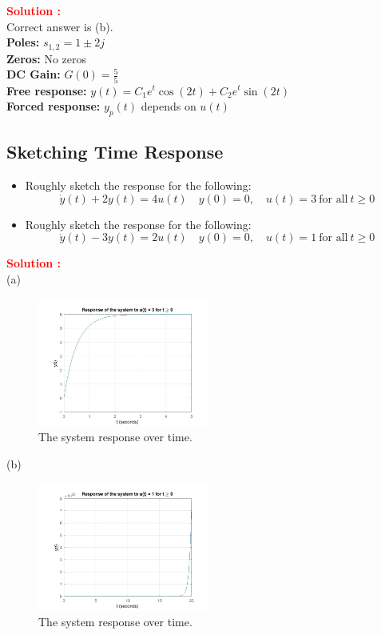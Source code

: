 \documentclass[12pt]{article}
\begin{document}
\textbf{\textcolor{red}{Solution :}} \\
Correct answer is (b).\\
\textbf{Poles:} \(s_{1,2} = 1 \pm 2j\) \\
\textbf{Zeros:} No zeros \\
\textbf{DC Gain:} \(G(0) = \frac{5}{5}\) \\
\textbf{Free response:} \(y(t) = C_1 e^{t} \cos(2t) + C_2 e^{t} \sin(2t)\) \\
\textbf{Forced response:} \(y_p(t)\) depends on \(u(t)\) \\
\clearpage

\subsection{Sketching Time Response}

\begin{itemize}
    \item[(a)] Roughly sketch the response for the following:
    \begin{equation}
        \dot{y}(t) + 2 y(t) = 4 u(t) \quad y(0) = 0, \quad u(t) = 3 \ \text{for all} \ t \geq 0
    \end{equation}
    \item[(b)] Roughly sketch the response for the following:
        \begin{equation}
        \dot{y}(t) - 3 y(t) = 2 u(t) \quad y(0) = 0, \quad u(t) = 1 \ \text{for all} \ t \geq 0
    \end{equation}

\end{itemize}

\textbf{\textcolor{red}{Solution :}} \\
(a)
    \begin{figure}[H]
    \centering
    \includegraphics[width=0.5\textwidth]{figs/3.12-1.jpg}
    \caption{The system response over time.}
    \label{fig:yb}
\end{figure}
(b)
\begin{figure}[H]
    \centering
    \includegraphics[width=0.5\textwidth]{figs/3.12-2.jpg}
    \caption{The system response over time.}
    \label{fig:yb}
\end{figure}
\clearpage
\end{document}
